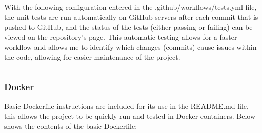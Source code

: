 \documentclass[./project-report/src/latex/project-report.tex]{subfiles}
\begin{document}
With the following configuration entered in the .github/workflows/tests.yml file, the unit tests are run automatically on GitHub servers after each commit that is pushed to 
GitHub, and the status of the tests (either passing or failing) can be viewed on the repository's page. This automatic testing allows for a faster workflow and allows me to 
identify which changes (commits) cause issues within the code, allowing for easier maintenance of the project.

\inputminted{yaml}{./.github/workflows/tests.yml}

\subsubsection{Docker}

Basic Dockerfile instructions are included for its use in the README.md file, this allows the project to be quickly run and tested in Docker containers. Below shows the 
contents of the basic Dockerfile:

\inputminted{docker}{./Dockerfile}
\end{document}
